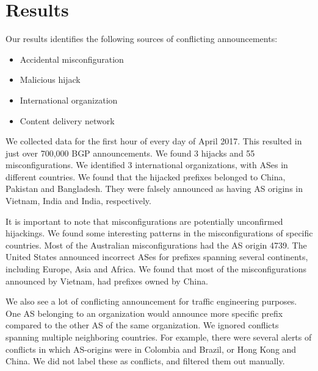  \section{Results}\label{sec:results}
 
Our results identifies the following sources of conflicting announcements:
\begin{itemize}
\item Accidental misconfiguration
\item Malicious hijack
\item International organization
\item Content delivery network
\end{itemize}

We collected data for the first hour of every day of April 2017. This resulted in just over 700,000 BGP announcements. We found 3 hijacks and 55 misconfigurations. We identified 3 international organizations, with ASes in different countries. We found that the hijacked prefixes belonged to China, Pakistan and Bangladesh. They were falsely announced as having AS origins in Vietnam, India and India, respectively.

It is important to note that misconfigurations are potentially unconfirmed hijackings. We found some interesting patterns in the misconfigurations of specific countries. Most of the Australian misconfigurations had the AS origin 4739. The United States announced incorrect ASes for prefixes spanning several continents, including Europe, Asia and Africa. We found that most of the misconfigurations announced by Vietnam, had prefixes owned by China. 

We also see a lot of conflicting announcement for traffic engineering purposes. One AS belonging to an organization would announce more specific prefix compared to the other AS of the same organization. We ignored conflicts spanning multiple neighboring countries. For example, there were several alerts of conflicts in which AS-origins were in Colombia and Brazil, or Hong Kong and China. We did not label these as conflicts, and filtered them out manually.
